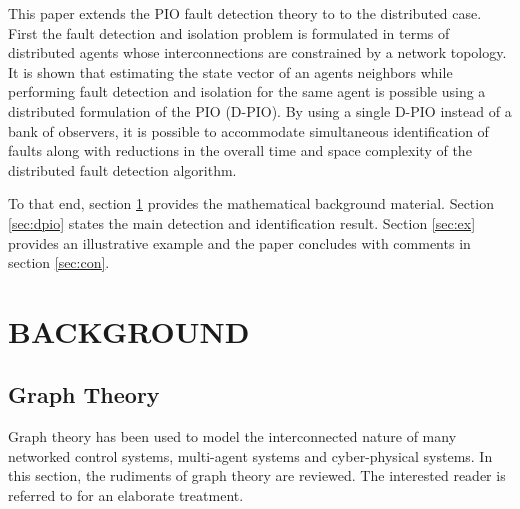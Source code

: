 \documentclass[letterpaper, 11 pt, conference]{ieeeconf}  %
\begin{document}
\medskip

This paper extends the PIO fault detection theory to to the distributed case. First the fault detection and isolation problem is formulated in terms of distributed agents whose interconnections are constrained by a network topology. It is shown that estimating the state vector of an agents neighbors while performing fault detection and isolation for the same agent is possible using a distributed formulation of the PIO (D-PIO). By using a single D-PIO instead of a bank of observers, it is possible to accommodate simultaneous identification of faults along with reductions in the overall time and space complexity of the distributed fault detection algorithm. 

\medskip

To that end, section \ref{sec:back} provides the mathematical background material.  Section \ref{sec:dpio} states the main detection and identification result. Section \ref{sec:ex} provides an illustrative example and the paper concludes with comments in section \ref{sec:con}.

\section{BACKGROUND} \label{sec:back}
\subsection{Graph Theory}
Graph theory has been used to model the interconnected nature of many networked control systems, multi-agent systems and cyber-physical systems. In this section, the rudiments of graph theory are reviewed. The interested reader is referred to \cite{godsil_algebraic_2013} for an elaborate treatment.
\end{document}

